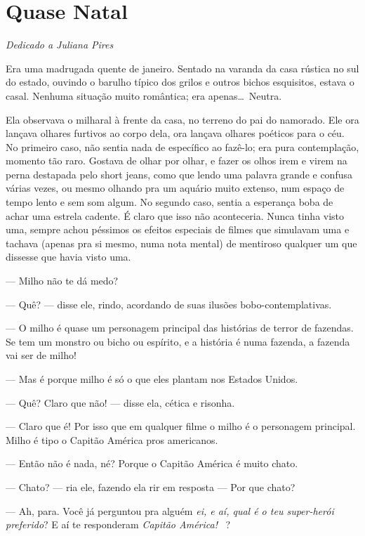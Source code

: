 \chapter{Quase Natal}

\begin{flushright}
\emph{Dedicado a Juliana Pires}
\end{flushright}

Era uma madrugada quente de janeiro. Sentado na varanda da casa rústica no sul do estado, ouvindo o barulho típico dos grilos e outros bichos esquisitos, estava o casal. Nenhuma situação muito romântica; era apenas\ldots \ Neutra.

Ela observava o milharal à frente da casa, no terreno do pai do namorado. Ele ora lançava olhares furtivos ao corpo dela, ora lançava olhares poéticos para o céu. No primeiro caso, não sentia nada de específico ao fazê-lo; era pura contemplação, momento tão raro. Gostava de olhar por olhar, e fazer os olhos irem e virem na perna destapada pelo short jeans, como que lendo uma palavra grande e confusa várias vezes, ou mesmo olhando pra um aquário muito extenso, num espaço de tempo lento e sem som algum. No segundo caso, sentia a esperança boba de achar uma estrela cadente. É claro que isso não aconteceria. Nunca tinha visto uma, sempre achou péssimos os efeitos especiais de filmes que simulavam uma e tachava (apenas pra si mesmo, numa nota mental) de mentiroso qualquer um que dissesse que havia visto uma.

--- Milho não te dá medo?

--- Quê? --- disse ele, rindo, acordando de suas ilusões bobo-contemplativas.

--- O milho é quase um personagem principal das histórias de terror de fazendas. Se tem um monstro ou bicho ou espírito, e a história é numa fazenda, a fazenda vai ser de milho!

--- Mas é porque milho é só o que eles plantam nos Estados Unidos.

--- Quê? Claro que não! --- disse ela, cética e risonha.

--- Claro que é! Por isso que em qualquer filme o milho é o personagem principal. Milho é tipo o Capitão América pros americanos.

--- Então não é nada, né? Porque o Capitão América é muito chato.

--- Chato? --- ria ele, fazendo ela rir em resposta --- Por que chato?

--- Ah, para. Você já perguntou pra alguém \emph{ei, e aí, qual é o teu super-herói preferido}? E aí te responderam \emph{Capitão América!} \ ?

